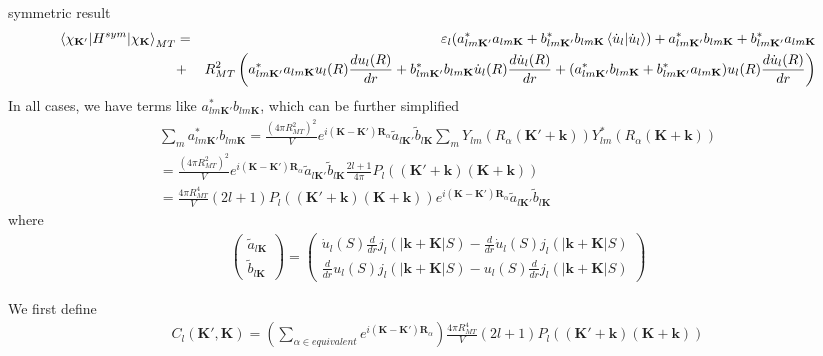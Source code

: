 \documentclass[aps,prb,floatfix,epsfig,singlecolumn,showpacs,preprintnumbers]{revtex4}
\newcommand{\vR}{{\mathbf{R}}}
\newcommand{\vk}{{\mathbf{k}}}
\newcommand{\vK}{{\mathbf{K}}}
\begin{document}
symmetric result
\begin{eqnarray}
\braket{\chi_{\vK'}|H^{sym}|\chi_\vK}_{MT}&=&\varepsilon_l (a_{lm\vK'}^* a_{lm\vK} +b_{lm\vK'}^* b_{lm\vK}  \braket{\dot{u}_l|\dot{u}_l})+a_{lm\vK'}^* b_{lm\vK} +b_{lm\vK'}^*  a_{lm\vK}
\\
&+&R_{MT}^2 \left(
a_{lm\vK'}^*a_{lm\vK} u_l(R) \frac{d u_l(R)}{dr}+
b_{lm\vK'}^* b_{lm\vK}  \dot{u}_l(R) \frac{d\dot{u}_l(R)}{dr}+
(a_{lm\vK'}^* b_{lm\vK}+b_{lm\vK'}^*  a_{lm\vK})  u_l(R) \frac{d\dot{u}_l(R)}{dr}
\right)\nonumber
\end{eqnarray}
In all cases, we have terms like $a_{lm\vK'}^*b_{lm\vK}$, which can be
further simplified
\begin{eqnarray}
\sum_m a_{lm\vK'}^*b_{lm\vK} =
\frac{(4\pi R_{MT}^2)^2}{V} e^{i(\vK-\vK')\vR_\alpha}  \tilde{a}_{l\vK'} \tilde{b}_{l\vK} \sum_m Y_{lm}(R_\alpha(\vK'+\vk))Y^*_{lm}(R_\alpha(\vK+\vk))
\\
=\frac{(4\pi R_{MT}^2)^2}{V} e^{i(\vK-\vK')\vR_\alpha}  \tilde{a}_{l\vK'}\tilde{b}_{l\vK} 
\frac{2l+1}{4\pi}P_l((\vK'+\vk)(\vK+\vk))
\\
=\frac{ 4\pi R_{MT}^4}{V} 
(2l+1)P_l((\vK'+\vk)(\vK+\vk))
e^{i(\vK-\vK')\vR_\alpha}  \tilde{a}_{l\vK'} \tilde{b}_{l\vK} 
\end{eqnarray}
where
\begin{eqnarray}
\left(
\begin{array}{c}
\tilde{a}_{l\vK}\\
\tilde{b}_{l\vK}
\end{array}\right)
=
\left(
\begin{array}{c}
\dot{u}_l(S)\frac{d}{dr} j_l(|\vk+\vK|S)-\frac{d}{dr} \dot{u}_l(S) j_l(|\vk+\vK|S)\\
\frac{d}{dr} u_l(S) j_l(|\vk+\vK|S)- u_l(S) \frac{d}{dr} j_l(|\vk+\vK|S)
\end{array}
\right)
\end{eqnarray}

We first define
\begin{eqnarray}
C_l(\vK',\vK) = \left(\sum_{\alpha\in equivalent}e^{i(\vK-\vK')\vR_\alpha}\right)
\frac{ 4\pi R_{MT}^4}{V} (2l+1)P_l((\vK'+\vk)(\vK+\vk))
\end{eqnarray}
\end{document}

